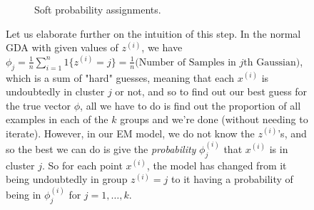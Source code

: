 \begin{algo}
\begin{enumerate}
\begin{figure}[H]
\begin{subfigure}[b]{0.48\textwidth}
          \caption{Soft probability assignments.}
          \label{fig:soft-guesses}
        \end{subfigure}
        \caption{Let us elaborate further on the intuition of this step. In the normal GDA with given values of $z^{(i)}$, we have $\phi_j = \frac{1}{n} \sum_{i=1}^n 1\{z^{(i)} = j\} = \frac{1}{n}\big(\text{Number of Samples in }j\text{th Gaussian}\big)$, which is a sum of "hard" guesses, meaning that each $x^{(i)}$ is undoubtedly in cluster $j$ or not, and so to find out our best guess for the true vector $\phi$, all we have to do is find out the proportion of all examples in each of the $k$ groups and we're done (without needing to iterate). However, in our EM model, we do not know the $z^{(i)}$'s, and so the best we can do is give the \textit{probability} $\phi^{(i)}_j$ that $x^{(i)}$ is in cluster $j$. So for each point $x^{(i)}$, the model has changed from it being undoubtedly in group $z^{(i)} = j$ to it having a probability of being in $\phi^{(i)}_j$ for $j = 1, \ldots, k$.}
        \label{fig:guesses-comparison}
      \end{figure}


\end{enumerate}
\end{algo}
